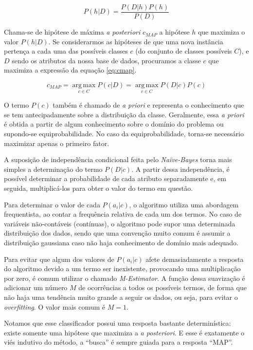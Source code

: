\documentclass{article}
\begin{document}
\begin{equation}
P(h|D) = \frac{P(D|h) P(h)}{P(D)}
\label{eq:bayes}
\end{equation}

Chama-se de hipótese de máxima {\it a posteriori} $c_{MAP}$ a hipótese $h$ que maximiza o valor $P(h|D)$.
Se considerarmos as hipóteses de que uma nova instância pertença a cada uma das possíveis classes $c$
(do conjunto de classes possíveis $C$),
e $D$ sendo os atributos da nossa base de dados,
procuramos a classe $c$ que maximiza a expressão da equação \ref{eq:cmap}.

\begin{equation}
c_{MAP} = \operatorname*{arg\,max}_{c \in C} P(c|D)
= \operatorname*{arg\,max}_{c \in C} P(D|c) P(c)
\label{eq:cmap}
\end{equation}

O termo $P(c)$ também é chamado de {\it a priori} e representa o conhecimento que se tem antecipadamente sobre a distribuição da classe.
Geralmente, essa {\it a priori} é obtida a partir de algum conhecimento sobre o domínio do problema ou supondo-se equiprobabilidade.
No caso da equiprobabilidade, torna-se necessário maximizar apenas o primeiro fator.

A suposição de independência condicional feita pelo {\it Naïve-Bayes} torna mais simples a determinação do termo $P(D|c)$.
A partir dessa independência, é possível determinar a probabilidade de cada atributo separadamente e, em seguida, multiplicá-los para obter o valor do termo em questão.

Para determinar o valor de cada $P(a_i|c)$, o algoritmo utiliza uma abordagem frequentista,
ao contar a frequência relativa de cada um dos termos.
No caso de variáveis não-contáveis (contínuas),
o algoritmo pode supor uma determinada distribuição dos dados,
sendo que uma convenção muito comum é assumir a distribuição gaussiana caso não haja
conhecimento de domínio mais adequado.

Para evitar que algum dos valores de $P(a_i|c)$ afete demasiadamente a resposta do algoritmo
devido a um termo ser inexistente, provocando uma multiplicação por zero,
é comum utilizar o chamado {\it M-Estimator}.
A função dessa suavização é adicionar um número $M$ de ocorrências a todos os possíveis termos,
de forma que não haja uma tendência muito grande a seguir os dados,
ou seja, para evitar o {\it overfitting}.
O valor mais comum é $M=1$.

Notamos que esse classificador possui uma resposta bastante determinística:
existe somente uma hipótese que maximiza a {\it a posteriori}.
E esse é exatamente o viés indutivo do método,
a ``busca'' é sempre guiada para a resposta ``MAP''.
\end{document}

